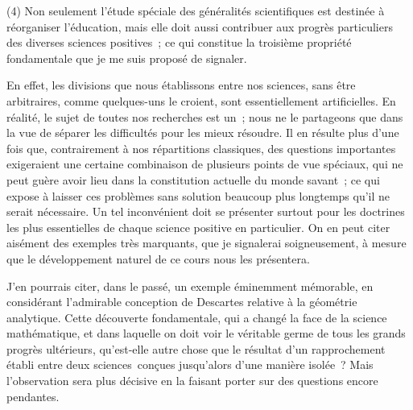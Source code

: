 \documentclass[french,twoside]{book} %
\begin{document}
(4) Non seulement l’étude spéciale des généralités scientifiques est destinée à réorganiser l’éducation, mais elle doit aussi contribuer aux progrès particuliers des diverses sciences positives ; ce qui constitue la troisième propriété fondamentale que je me suis proposé de signaler.\par
En effet, les divisions que nous établissons entre nos sciences, sans être arbitraires, comme quelques-uns le croient, sont essentiellement artificielles. En réalité, le sujet de toutes nos recherches est un ; nous ne le partageons que dans la vue de séparer les difficultés pour les mieux résoudre. Il en résulte plus d’une fois que, contrairement à nos répartitions classiques, des questions importantes exigeraient une certaine combinaison de plusieurs points de vue spéciaux, qui ne peut guère avoir lieu dans la constitution actuelle du monde savant ; ce qui expose à laisser ces problèmes sans solution beaucoup plus longtemps qu’il ne serait nécessaire. Un tel inconvénient doit se présenter surtout pour les doctrines les plus essentielles de chaque science positive en particulier. On en peut citer aisément des exemples très marquants, que je signalerai soigneusement, à mesure que le développement naturel de ce cours nous les présentera.\par
J’en pourrais citer, dans le passé, un exemple éminemment mémorable, en considérant l’admirable conception de Descartes relative à la géométrie analytique. Cette découverte fondamentale, qui a changé la face de la science mathématique, et dans laquelle on doit voir le véritable germe de tous les grands progrès ultérieurs, qu’est-elle autre chose que le résultat d’un rapprochement établi entre deux sciences conçues jusqu’alors d’une manière isolée ? Mais l’observation sera plus décisive en la faisant porter sur des questions encore pendantes.\par
\end{document}
